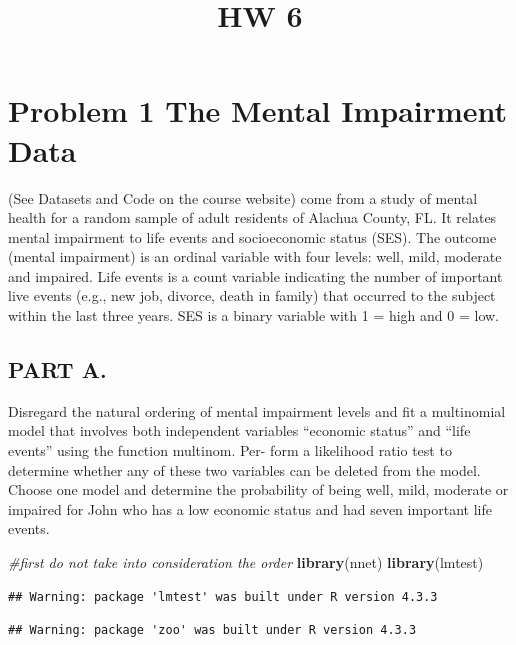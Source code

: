 \documentclass[
]{article}
\title{HW 6}
\author{}
\date{\vspace{-2.5em}}
\newenvironment{Shaded}{\begin{snugshade}}{\end{snugshade}}
\newcommand{\CommentTok}[1]{\textcolor[rgb]{0.56,0.35,0.01}{\textit{#1}}}
\newcommand{\FunctionTok}[1]{\textcolor[rgb]{0.13,0.29,0.53}{\textbf{#1}}}
\newcommand{\NormalTok}[1]{#1}
\begin{document}
\maketitle

\section{Problem 1 The Mental Impairment
Data}\label{problem-1-the-mental-impairment-data}

(See Datasets and Code on the course website) come from a study of
mental health for a random sample of adult residents of Alachua County,
FL. It relates mental impairment to life events and socioeconomic status
(SES). The outcome (mental impairment) is an ordinal variable with four
levels: well, mild, moderate and impaired. Life events is a count
variable indicating the number of important live events (e.g., new job,
divorce, death in family) that occurred to the subject within the last
three years. SES is a binary variable with 1 = high and 0 = low.

\subsection{PART A.}\label{part-a.}

Disregard the natural ordering of mental impairment levels and fit a
multinomial model that involves both independent variables ``economic
status'' and ``life events'' using the function multinom. Per- form a
likelihood ratio test to determine whether any of these two variables
can be deleted from the model. Choose one model and determine the
probability of being well, mild, moderate or impaired for John who has a
low economic status and had seven important life events.

\begin{Shaded}
\begin{Highlighting}[]
\CommentTok{\#first do not take into consideration the order}
\FunctionTok{library}\NormalTok{(nnet)}
\FunctionTok{library}\NormalTok{(lmtest)}
\end{Highlighting}
\end{Shaded}

\begin{verbatim}
## Warning: package 'lmtest' was built under R version 4.3.3
\end{verbatim}

\begin{verbatim}
## Warning: package 'zoo' was built under R version 4.3.3
\end{verbatim}
\end{document}
